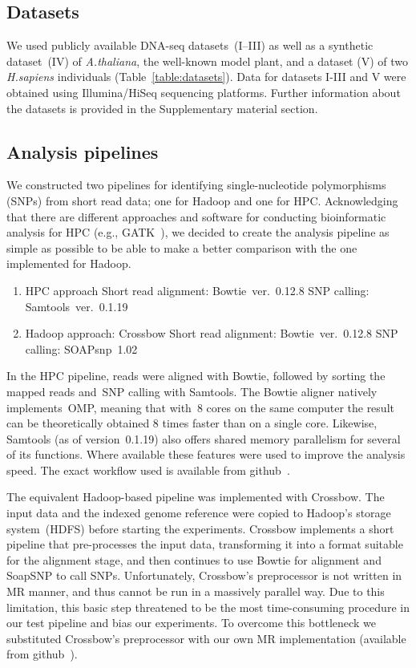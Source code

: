 \documentclass[10pt]{article}
\begin{document}
\subsection*{Datasets}
We used publicly available DNA-seq datasets~(I--III) as well as a synthetic dataset~(IV) of {\it A.thaliana}, the well-known model plant, and a dataset (V) of two {\it H.sapiens} individuals (Table~\ref{table:datasets}). Data for datasets I-III and V were obtained using Illumina/HiSeq sequencing platforms. Further information about the datasets is provided in the Supplementary material section.


\subsection*{Analysis pipelines}
We constructed two pipelines for identifying single-nucleotide polymorphisms (SNPs) from short read data; one for Hadoop and one for HPC.
Acknowledging that there are different approaches and software for conducting bioinformatic analysis for HPC (e.g., GATK~\cite{gatk}), we decided to create the analysis pipeline as simple as possible to be able to make a better comparison with the one implemented for Hadoop.

\begin{enumerate}
\item HPC approach
\subitem Short read alignment: Bowtie~ver.~0.12.8
\subitem SNP calling: Samtools~ver.~0.1.19
\item Hadoop approach: Crossbow
\subitem Short read alignment: Bowtie~ver.~0.12.8
\subitem SNP calling: SOAPsnp~1.02~\cite{soapsnp}
\end{enumerate}


In the HPC pipeline, reads were aligned with Bowtie, followed by sorting the mapped reads and~SNP calling with Samtools. The Bowtie aligner natively implements~OMP, meaning that with~8 cores on the same computer the result can be theoretically obtained 8 times faster than on a single core. Likewise, Samtools (as of version~0.1.19) also offers shared memory parallelism for several of its functions. Where available these features were used to improve the analysis speed. The exact workflow used is available from github~\cite{code_repo}.

The equivalent Hadoop-based pipeline was implemented with Crossbow. The input data and the indexed genome reference were copied to Hadoop's storage system~(HDFS) before starting the experiments. Crossbow implements a short pipeline that pre-processes the input data, transforming it into a format suitable for the alignment stage, and then continues to use Bowtie for alignment and SoapSNP to call SNPs.  Unfortunately, Crossbow's preprocessor is not written in MR manner, and thus cannot be run in a massively parallel way. Due to this limitation, this basic step threatened to be the most time-consuming procedure in our test pipeline and bias our experiments. To overcome this bottleneck we substituted Crossbow's preprocessor with our own MR implementation (available from github~\cite{code_repo}).
\end{document}
